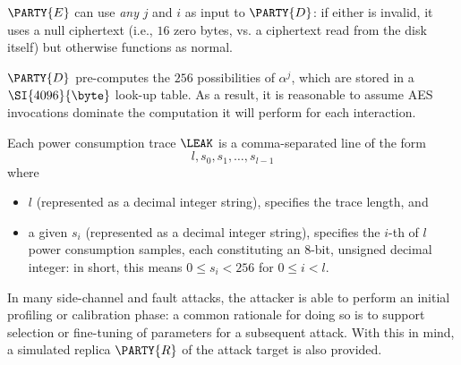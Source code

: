 \documentclass[crop={false},multi={true},tikz={true}]{standalone}
\begin{document}
\begin{itemize}
{      \noindent
      $\PARTY{E}$ can use {\em any} $j$ and $i$ as input to $\PARTY{D}$: if 
      either is invalid, it uses a null ciphertext (i.e., $16$ zero bytes, 
      vs. a ciphertext read from the disk itself) but otherwise functions 
      as normal.
\item $\PARTY{D}$ pre-computes the $256$ possibilities of $\alpha^j$, which 
      are stored in a $\SI{4096}{\byte}$ look-up table.  As a result, it is 
      reasonable to assume AES invocations dominate the computation it will
      perform for each interaction.
}{}%
\item Each power consumption trace $\LEAK$ is a comma-separated line of the 
      form
      \[
      l, s_0, s_1, \ldots, s_{l-1}
      \]
      where
         
      \begin{itemize}
      \item $l$
            (represented as a                       decimal integer string),
            specifies the trace length, 
            and
      \item a given $s_i$ 
            (represented as a                       decimal integer string),
            specifies the $i$-th of $l$ power consumption samples, each 
            constituting an $8$-bit, unsigned decimal integer: in short, 
            this means $0 \leq s_i < 256$ for $0 \leq i < l$.
      \end{itemize}

\end{itemize}


In many side-channel and fault attacks, the attacker is able to perform an 
initial profiling or calibration phase: a common rationale for doing so is 
to support selection or fine-tuning of parameters for a subsequent attack.  
With this in mind, a simulated replica $\PARTY{R}$ of the attack target is 
also provided.
%
\end{document}
